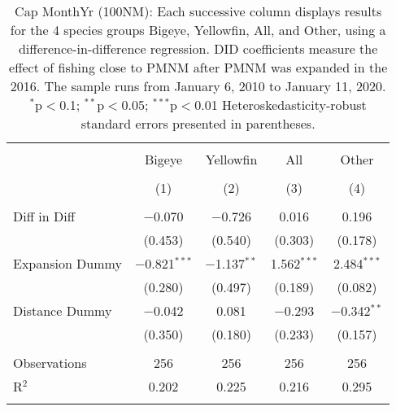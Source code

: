 
\begin{table}[!htbp] \centering 
  \caption{Cap MonthYr (100NM): Each successive column displays results for the 4 species groups Bigeye, Yellowfin, All, and Other, using a difference-in-difference regression. DID coefficients measure the effect of fishing close to PMNM after PMNM was expanded in the 2016. The sample runs from January 6, 2010 to January 11, 2020. $^{*}$p$<$0.1; $^{**}$p$<$0.05; $^{***}$p$<$0.01 Heteroskedasticity-robust standard errors presented in parentheses.} 
  \label{tbl:timeFE100NM} 
\begin{tabular}{@{\extracolsep{5pt}}lcccc} 
\\[-1.8ex]\hline 
\hline \\[-1.8ex] 
 & Bigeye & Yellowfin & All & Other \\ 
\\[-1.8ex] & (1) & (2) & (3) & (4)\\ 
\hline \\[-1.8ex] 
 Diff in Diff & $-$0.070 & $-$0.726 & 0.016 & 0.196 \\ 
  & (0.453) & (0.540) & (0.303) & (0.178) \\ 
  Expansion Dummy & $-$0.821$^{***}$ & $-$1.137$^{**}$ & 1.562$^{***}$ & 2.484$^{***}$ \\ 
  & (0.280) & (0.497) & (0.189) & (0.082) \\ 
  Distance Dummy & $-$0.042 & 0.081 & $-$0.293 & $-$0.342$^{**}$ \\ 
  & (0.350) & (0.180) & (0.233) & (0.157) \\ 
 \hline \\[-1.8ex] 
Observations & 256 & 256 & 256 & 256 \\ 
R$^{2}$ & 0.202 & 0.225 & 0.216 & 0.295 \\ 
\hline 
\hline \\[-1.8ex] 
\end{tabular} 
\end{table} 
